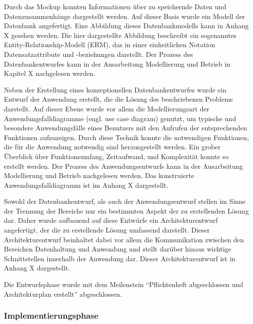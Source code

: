 
Durch das Mockup konnten Informationen über zu speichernde Daten und
Datenzusammenhänge dargestellt werden. Auf dieser Basis wurde ein Modell der
Datenbank angefertigt. Eine Abbildung dieses Datenbankmodells kann in Anhang X
gesehen werden. Die hier dargestellte Abbildung beschreibt ein sogenanntes
Entity-Relationship-Modell (ERM), das in einer einheitlichen Notation
Datensatzattribute und -beziehungen darstellt. Der Prozess des
Datenbankentwurfes kann in der Ausarbeitung Modellierung und Betrieb in Kapitel
X nachgelesen werden.

Neben der Erstellung eines konzeptionellen Datenbankentwurfes wurde ein Entwurf
der Anwendung erstellt, die die Lösung des beschriebenen Problems darstellt.
Auf dieser Ebene wurde vor allem die Modellierungsart der
Anwendungsfalldiagramme (engl. use case diagram) genutzt, um typische und
besondere Anwendungsfälle eines Benutzers mit den Aufrufen der entsprechenden
Funktionen aufzuzeigen. Durch diese Technik konnte die notwendigen Funktionen,
die für die Anwendung notwendig sind herausgestellt werden. Ein grober
Überblick über Funktionsumfang, Zeitaufwand, und Komplexität konnte so erstellt
werden. Der Prozess des Anwendungsentwurfs kann in der Ausarbeitung
Modellierung und Betrieb nachgelesen werden.
Das konstruierte Anwendungsfalldiagramm ist im Anhang X dargestellt.

Sowohl der Datenbankentwurf, als auch der Anwendungsentwurf stellen im Sinne
der Trennung der Bereiche nur ein bestimmten Aspekt der zu erstellenden Lösung
dar. Daher wurde aufbauend auf diese Entwürfe ein Architekturentwurf
angefertigt, der die zu erstellende Lösung umfassend darstellt. Dieser
Architekturentwurf beinhaltet dabei vor allem die Kommunikation zwischen den
Bereichen Datenhaltung und Anwendung und stellt darüber hinaus wichtige
Schnittstellen innerhalb der Anwendung dar. Dieser Architekturentwurf ist in
Anhang X dargestellt.

Die Entwurfsphase wurde mit dem Meilenstein "`Pflichtenheft abgeschlossen und
Architekturplan erstellt"' abgeschlossen.


\subsubsection{Implementierungsphase}
\label{sec:Implementierungsphase}

